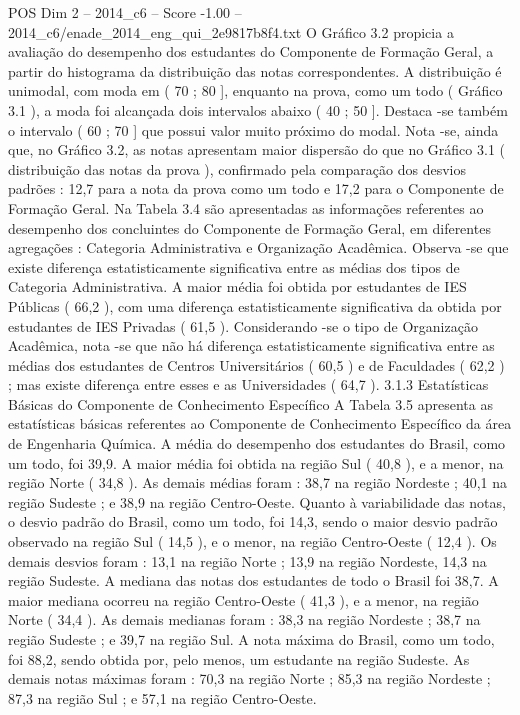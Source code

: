 \begin{textsample}{POS Dim 2 – 2014\_c6 – Score -1.00 – 2014\_c6/enade\_2014\_eng\_qui\_2e9817b8f4.txt}
O Gráfico 3.2 propicia a avaliação do desempenho dos estudantes do Componente de Formação Geral, a partir do histograma da distribuição das notas correspondentes.
A distribuição é unimodal, com moda em ( 70 ; 80 ], enquanto na prova, como um todo ( Gráfico 3.1 ), a moda foi alcançada dois intervalos abaixo ( 40 ; 50 ].
Destaca -se também o intervalo ( 60 ; 70 ] que possui valor muito próximo do modal.
Nota -se, ainda que, no Gráfico 3.2, as notas apresentam maior dispersão do que no Gráfico 3.1 ( distribuição das notas da prova ), confirmado pela comparação dos desvios padrões : 12,7 para a nota da prova como um todo e 17,2 para o Componente de Formação Geral.
Na Tabela 3.4 são apresentadas as informações referentes ao desempenho dos concluintes do Componente de Formação Geral, em diferentes agregações : Categoria Administrativa e Organização Acadêmica.
Observa -se que existe diferença estatisticamente significativa entre as médias dos tipos de Categoria Administrativa.
A maior média foi obtida por estudantes de IES Públicas ( 66,2 ), com uma diferença estatisticamente significativa da obtida por estudantes de IES Privadas ( 61,5 ).
Considerando -se o tipo de Organização Acadêmica, nota -se que não há diferença estatisticamente significativa entre as médias dos estudantes de Centros Universitários ( 60,5 ) e de Faculdades ( 62,2 ) ; mas existe diferença entre esses e as Universidades ( 64,7 ). 3.1.3 Estatísticas Básicas do Componente de Conhecimento Específico A Tabela 3.5 apresenta as estatísticas básicas referentes ao Componente de Conhecimento Específico da área de Engenharia Química.
A média do desempenho dos estudantes do Brasil, como um todo, foi 39,9.
A maior média foi obtida na região Sul ( 40,8 ), e a menor, na região Norte ( 34,8 ).
As demais médias foram : 38,7 na região Nordeste ; 40,1 na região Sudeste ; e 38,9 na região Centro-Oeste.
Quanto à variabilidade das notas, o desvio padrão do Brasil, como um todo, foi 14,3, sendo o maior desvio padrão observado na região Sul ( 14,5 ), e o menor, na região Centro-Oeste ( 12,4 ).
Os demais desvios foram : 13,1 na região Norte ; 13,9 na região Nordeste, 14,3 na região Sudeste.
A mediana das notas dos estudantes de todo o Brasil foi 38,7.
A maior mediana ocorreu na região Centro-Oeste ( 41,3 ), e a menor, na região Norte ( 34,4 ).
As demais medianas foram : 38,3 na região Nordeste ; 38,7 na região Sudeste ; e 39,7 na região Sul.
A nota máxima do Brasil, como um todo, foi 88,2, sendo obtida por, pelo menos, um estudante na região Sudeste.
As demais notas máximas foram : 70,3 na região Norte ; 85,3 na região Nordeste ; 87,3 na região Sul ; e 57,1 na região Centro-Oeste.

\end{textsample}
